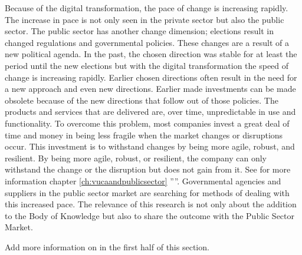Because of the digital transformation, the pace of change is increasing rapidly. The increase in pace is not only seen in the private sector but also the public sector. The public sector has another change dimension; elections result in changed regulations and governmental policies. These changes are a result of a new political agenda. In the past, the chosen direction was stable for at least the period until the new elections but with the digital transformation the speed of change is increasing rapidly. Earlier chosen directions often result in the need for a new approach and even new directions. Earlier made investments can be made obsolete because of the new directions that follow out of those policies. The products and services that are delivered are, over time, unpredictable in use and functionality. To overcome this problem, most companies invest a great deal of time and money in being less fragile when the market changes or disruptions occur. This investment is to withstand changes by being more agile, robust, and resilient. By being more agile, robust, or resilient, the company can only withstand the change or the disruption but does not gain from it. See for more information chapter \ref{ch:vucaandpublicsector} ''''. Governmental agencies and suppliers in the public sector market are searching for methods of dealing with this increased pace. The relevance of this research is not only about the addition to the Body of Knowledge but also to share the outcome with the Public Sector Market.

\begin{remark}
	Add more information on \parencite{Kastner2017} in the first half of this section.
\end{remark}

